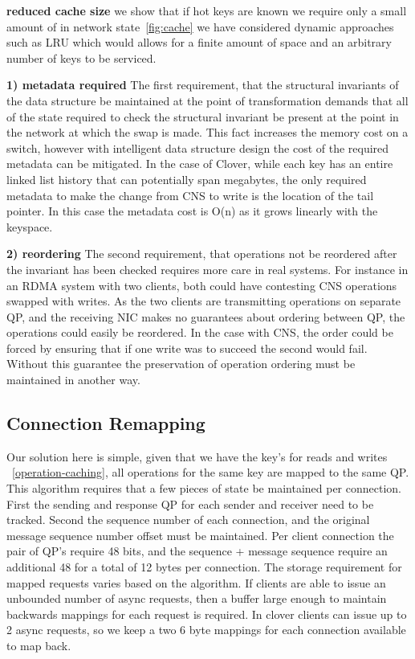 \textbf{reduced cache size} we show that if hot keys are known we require only a
small amount of in network state~\ref{fig:cache} we have considered dynamic
approaches such as LRU which would allows for a finite amount of space and an
arbitrary number of keys to be serviced.

 

\textbf{1) metadata required} The first requirement, that the structural invariants
of the data structure be maintained at the point of transformation demands that
all of the state required to check the structural invariant be present at the
point in the network at which the swap is made. This fact increases the memory
cost on a switch, however with intelligent data structure design the cost of the
required metadata can be mitigated. In the case of Clover, while each key has
an entire linked list history that can potentially span megabytes, the only
required metadata to make the change from CNS to write is the location of the
tail pointer. In this case the metadata cost is O(n) as it grows linearly with
the keyspace.

\textbf{2) reordering} The second requirement, that operations not be reordered
after the invariant has been checked requires more care in real systems. For
instance in an RDMA system with two clients, both could have contesting CNS
operations swapped with writes. As the two clients are transmitting operations on
separate QP, and the receiving NIC makes no guarantees about ordering between QP,
the operations could easily be reordered. In the case with CNS, the order could
be forced by ensuring that if one write was to succeed the second would fail.
Without this guarantee the preservation of operation ordering must be maintained
in another way.

\subsection{Connection Remapping}


Our solution here is simple, given that we have the key's for reads and writes
~\ref{operation-caching}, all operations for the same key are mapped to the same
QP. 
This algorithm requires that a few pieces of state be maintained per connection.
First the sending and response QP for each sender and receiver need to be
tracked. Second the sequence number of each connection, and the original message
sequence number offset must be maintained. Per client connection the pair of
QP's require 48 bits, and the sequence + message sequence require an additional
48 for a total of 12 bytes per connection. The storage requirement for mapped
requests varies based on the algorithm. If clients are able to issue an
unbounded number of async requests, then a buffer large enough to maintain
backwards mappings for each request is required. In clover clients can issue up
to 2 async requests, so we keep a two 6 byte mappings for each connection
available to map back. 

